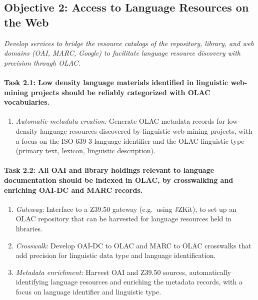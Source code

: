 \subsection*{Objective 2: Access to Language Resources on the Web}

\emph{Develop services to bridge the resource catalogs of the
  repository, library, and web domains (OAI, MARC, Google)
  to facilitate language resource discovery with precision through OLAC.}

\def\task{2.1}
\paragraph{Task {\task}: Low density language materials identified in
  linguistic web-mining projects should be reliably categorized with OLAC vocabularies.}

\begin{enumerate}[label=\emph{\task\alph*}]
\item \emph{Automatic metadata creation:}
  Generate OLAC metadata records for low-density
  language resources discovered by linguistic web-mining projects,
  with a focus on the ISO 639-3 language identifier and the OLAC
  linguistic type (primary text, lexicon, linguistic description).
\end{enumerate}

\def\task{2.2}
\paragraph{Task {\task}: All OAI and library holdings relevant to language
      documentation should be indexed in OLAC, by
      crosswalking and enriching OAI-DC and MARC records.}

\begin{enumerate}[label=\emph{\task\alph*}]
\item \emph{Gateway:}
  Interface to a Z39.50 gateway (e.g.~using JZKit), to set up an
  OLAC repository that can be harvested for language resources held in
  libraries.
\item \emph{Crosswalk:}
  Develop OAI-DC to OLAC and MARC to OLAC crosswalks that add
  precision for linguistic data type and language identification.
\item \emph{Metadata enrichment:}
  Harvest OAI and Z39.50 sources, automatically identifying language resources
  and enriching the metadata records, with a focus on language
  identifier and linguistic type.
\end{enumerate}

